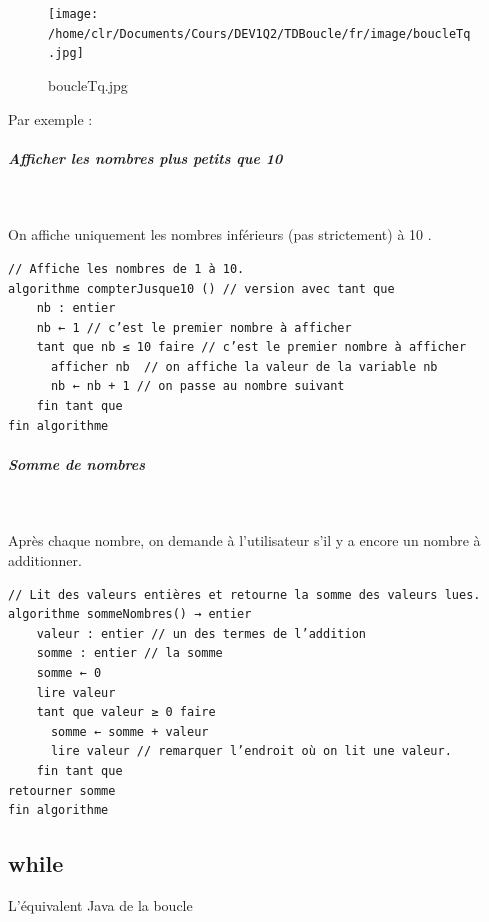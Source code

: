 \documentclass[11pt,a4paper]{article}
\begin{document}
            \par
        \begin{figure}[hbt]
				    \begin{center}
					\texttt{[image: /home/clr/Documents/Cours/DEV1Q2/TDBoucle/fr/image/boucleTq.jpg]}
						\end{center}
                
                    \caption[boucleTq.jpg]{boucleTq.jpg}
                \end{figure}
                    
            \par
        Par exemple : 
            \par
        
			
		\subparagraph{Afficher les nombres plus petits que 10} 
		
					\textcolor{white}{.} \par
				On affiche uniquement les nombres inf\'erieurs (pas strictement) \`a 10 .
            \par
        \begin{verbatim}
// Affiche les nombres de 1 à 10.
algorithme compterJusque10 () // version avec tant que
    nb : entier
    nb ← 1 // c’est le premier nombre à afficher
    tant que nb ≤ 10 faire // c’est le premier nombre à afficher
      afficher nb  // on affiche la valeur de la variable nb
      nb ← nb + 1 // on passe au nombre suivant
    fin tant que
fin algorithme
      \end{verbatim}
			
		\subparagraph{Somme de nombres} 
		
					\textcolor{white}{.} \par
				 Apr\`es chaque nombre, on demande \`a l'utilisateur s'il y a encore un nombre \`a additionner.
            \par
        \begin{verbatim}
// Lit des valeurs entières et retourne la somme des valeurs lues.
algorithme sommeNombres() → entier
    valeur : entier // un des termes de l’addition
    somme : entier // la somme
    somme ← 0
    lire valeur
    tant que valeur ≥ 0 faire
      somme ← somme + valeur
      lire valeur // remarquer l’endroit où on lit une valeur.
    fin tant que
retourner somme
fin algorithme
      \end{verbatim}\subsection{while}
		    L'\'equivalent Java de la boucle 
		  
\end{document}
